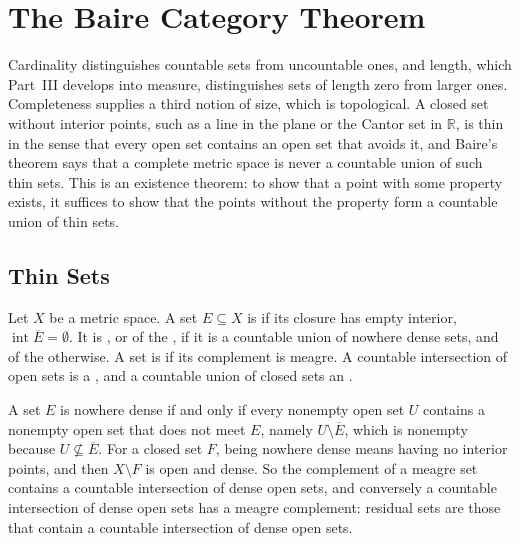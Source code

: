 \section{The Baire Category Theorem}
\label{sec:baire}

Cardinality distinguishes countable sets from uncountable ones, and length, which Part~III develops into measure, distinguishes sets of length zero from larger ones. Completeness supplies a third notion of size, which is topological. A closed set without interior points, such as a line in the plane or the Cantor set in $\mathbb R$, is thin in the sense that every open set contains an open set that avoids it, and Baire's theorem says that a complete metric space is never a countable union of such thin sets. This is an existence theorem: to show that a point with some property exists, it suffices to show that the points without the property form a countable union of thin sets.

\subsection{Thin Sets}

\begin{definition}
\label{def:meagre}
Let $X$ be a metric space. A set $E\subseteq X$ is  if its closure has empty interior, $\operatorname{int}\overline E=\emptyset$. It is , or of the , if it is a countable union of nowhere dense sets, and of the  otherwise. A set is  if its complement is meagre. A countable intersection of open sets is a , and a countable union of closed sets an .
\end{definition}

A set $E$ is nowhere dense if and only if every nonempty open set $U$ contains a nonempty open set that does not meet $E$, namely $U\setminus\overline E$, which is nonempty because $U\not\subseteq\overline E$. For a closed set $F$, being nowhere dense means having no interior points, and then $X\setminus F$ is open and dense. So the complement of a meagre set contains a countable intersection of dense open sets, and conversely a countable intersection of dense open sets has a meagre complement: residual sets are those that contain a countable intersection of dense open sets.

